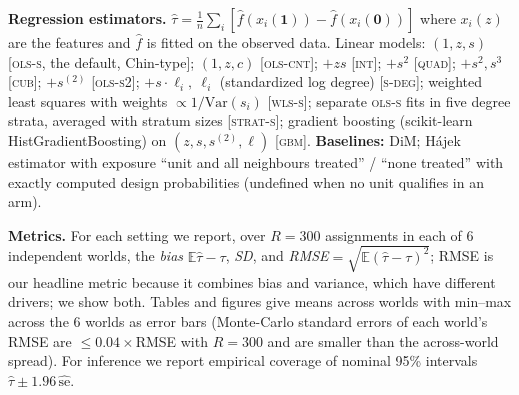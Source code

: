 \textbf{Regression estimators.} $\hat\tau=\frac1n\sum_i[\hat f(x_i(\mathbf 1))-\hat f(x_i(\mathbf 0))]$ where $x_i(z)$ are the features and $\hat f$ is fitted on the observed data. Linear models: $(1,z,s)$ [\textsc{ols-s}, the default, Chin-type]; $(1,z,c)$ [\textsc{ols-cnt}]; $+zs$ [\textsc{int}]; $+s^2$ [\textsc{quad}]; $+s^2,s^3$ [\textsc{cub}]; $+s^{(2)}$ [\textsc{ols-s2}]; $+s\cdot\ell_i,\ \ell_i$ (standardized log degree) [\textsc{s-deg}]; weighted least squares with weights $\propto1/\mathrm{Var}(s_i)$ [\textsc{wls-s}]; separate \textsc{ols-s} fits in five degree strata, averaged with stratum sizes [\textsc{strat-s}]; gradient boosting (scikit-learn HistGradientBoosting) on $(z,s,s^{(2)},\ell)$ [\textsc{gbm}]. \textbf{Baselines:} DiM; H\'ajek estimator with exposure ``unit and all neighbours treated'' / ``none treated'' with exactly computed design probabilities (undefined when no unit qualifies in an arm).

\textbf{Metrics.} For each setting we report, over $R=300$ assignments in each of $6$ independent worlds, the \emph{bias} $\mathbb E\hat\tau-\tau$, \emph{SD}, and \emph{RMSE}$=\sqrt{\mathbb E(\hat\tau-\tau)^2}$; RMSE is our headline metric because it combines bias and variance, which have different drivers; we show both. Tables and figures give means across worlds with min--max across the 6 worlds as error bars (Monte-Carlo standard errors of each world's RMSE are $\le0.04\times$RMSE with $R=300$ and are smaller than the across-world spread). For inference we report empirical coverage of nominal 95\% intervals $\hat\tau\pm1.96\,\widehat{\mathrm{se}}$.
